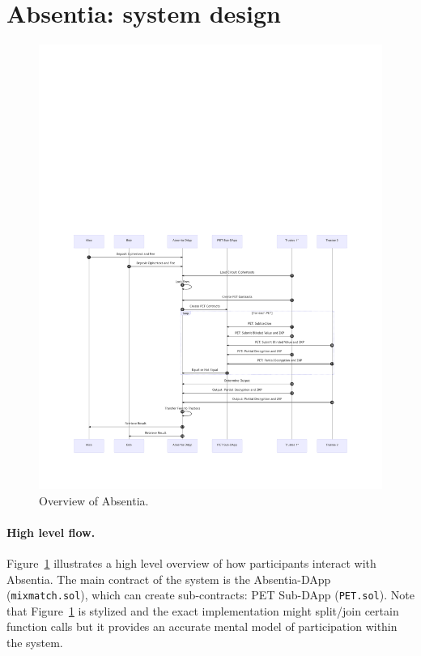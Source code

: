 
\section{Absentia: system design}
\label{sec:system}

\begin{figure}[t]
	\includegraphics[width=1\textwidth]{figures/absentia.pdf}
	\caption{Overview of Absentia.}
	\centering
	\label{fig:system}
\end{figure}


\paragraph{High level flow.} 
Figure~\ref{fig:system} illustrates a high level overview of how participants interact with Absentia. The main contract of the system is the Absentia-DApp (\texttt{mixmatch.sol}), which can create sub-contracts: PET Sub-DApp (\texttt{PET.sol}). Note that Figure~\ref{fig:system} is stylized and the exact implementation might split/join certain function calls but it provides an accurate mental model of participation within the system.

